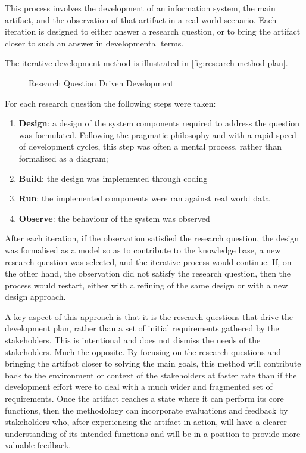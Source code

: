 This process involves the development of an information system, the main artifact, and the observation of that artifact in a real world scenario. Each iteration is designed to either answer a research question, or to bring the artifact closer to such an answer in developmental terms.

The iterative development method is illustrated in \autoref{fig:research-method-plan}.

\begin{figure}[h]
    \centering
    
    \caption[Research Question Driven Development]{Research Question Driven Development}
    \label{fig:research-method-plan}
\end{figure}

For each research question the following steps were taken:

\begin{enumerate}
    \item \textbf{Design}: a design of the system components required to address the question was formulated. Following the pragmatic philosophy and with a rapid speed of development cycles, this step was often a mental process, rather than formalised as a diagram;
    \item  \textbf{Build}: the design was implemented through coding
    \item  \textbf{Run}: the implemented components were ran against real world data
    \item  \textbf{Observe}: the behaviour of the system was observed
\end{enumerate}

After each iteration, if the observation satisfied the research question, the design was formalised as a model so as to contribute to the knowledge base, a new research question was selected, and the iterative process would continue. If, on the other hand, the observation did not satisfy the research question, then the process would restart, either with a refining of the same design or with a new design approach.

A key aspect of this approach is that it is the research questions that drive the development plan, rather than a set of initial requirements gathered by the stakeholders. This is intentional and does not dismiss the needs of the stakeholders. Much the opposite. By focusing on the research questions and bringing the artifact closer to solving the main goals, this method will contribute back to the environment or context of the stakeholders at faster rate than if the development effort were to deal with a much wider and fragmented set of requirements. Once the artifact reaches a state where it can perform its core functions, then the methodology can incorporate evaluations and feedback by stakeholders who, after experiencing the artifact in action, will have a clearer understanding of its intended functions and will be in a position to provide more valuable feedback.

